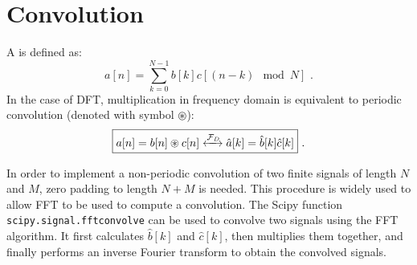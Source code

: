\section{Convolution}

%

A  is defined as:
\begin{equation}
  a[n] = \sum_{k=0}^{N-1} b[k]c[(n-k) \mod N] \,\,.
\end{equation}
In the case of DFT, multiplication in frequency domain is equivalent
to periodic convolution (denoted with symbol $\circledast$):
\begin{equation}
  \boxed{
    a[n] = b[n] \circledast c[n] \xleftrightarrow{\mathcal{F}_D} \hat{a}[k] = \hat{b}[k]\hat{c}[k]
  } \,\,.
\end{equation}

In order to implement a non-periodic convolution of two finite signals
of length $N$ and $M$, zero padding to length $N+M$ is needed. This
procedure is widely used to allow FFT to be used to compute a
convolution. The Scipy function \texttt{scipy.signal.fftconvolve} can
be used to convolve two signals using the FFT algorithm. It first
calculates $\hat{b}[k]$ and $\hat{c}[k]$, then multiplies them
together, and finally performs an inverse Fourier transform to obtain
the convolved signals.

